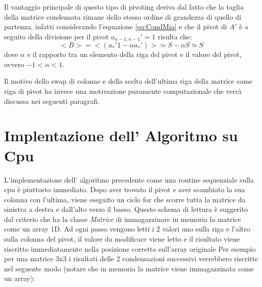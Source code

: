 \documentclass{article}
\begin{document}
\newline
Il vantaggio principale di questo tipo di pivoting deriva dal fatto che la taglia della matrice condensata rimane dello stesso ordine di grandezza di quello di partenza, infatti considerando l'equazione \ref{eq:CondMia} e che il pivot di $A'$ è  a seguito della divisione per il pivot $ a_{n-1,n-1}'=1$ risulta che:
\begin{displaymath}
<B> = <(a_{\ast}' 1 -\alpha a_{\ast}')>  \simeq S - \alpha S \simeq S
\end{displaymath}
dove $\alpha$ e il rapporto tra un elemento della riga del pivot e il valore del pivot, ovvero $-1<\alpha < 1$.

Il motivo dello swap di colonne e della scelta dell'ultima riga della matrice come riga di pivot ha invece una motivazione puramente computazionale che verrà discussa nei seguenti paragrafi.

\section{Implentazione dell' Algoritmo su Cpu}
L'implementazione dell' algoritmo precedente come una routine sequenziale sulla cpu è piuttosto immediato.
Dopo aver trovato il pivot e aver scambiato la sua colonna con l'ultima,  viene eseguito un ciclo for che scorre tutta la matrice da sinistra a destra e dall'alto verso il basso. 
Questo schema di lettura è suggerito dal criterio che ha la classe \textit{Matrice} di immagazzinare in memoria la matrice come un array 1D.
\newline
Ad ogni passo vengono letti i 2 valori uno sulla riga e l'altro sulla colonna del pivot, il valore da modificare viene letto e il risultato viene  riscritto immediatamente nella posizione corretta sull'array originale
Per esempio per una matrice 3x3 i risultati delle 2 condensazioni successivi verrebbero riscritte nel seguente modo (notare che in memoria la matrice viene immagazzinata come un array):
\end{document}
